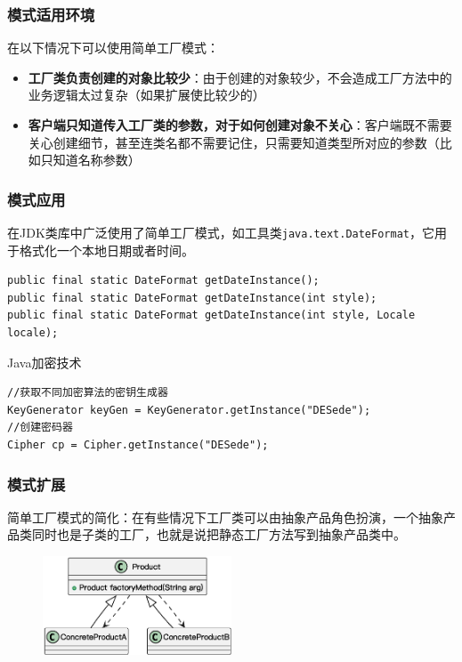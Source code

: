 \subsubsection{模式适用环境}
在以下情况下可以使用简单工厂模式：
\begin{itemize}
    \item \textbf{工厂类负责创建的对象比较少}：由于创建的对象较少，不会造成工厂方法中的业务逻辑太过复杂（如果扩展使比较少的）
    \item \textbf{客户端只知道传入工厂类的参数，对于如何创建对象不关心}：客户端既不需要关心创建细节，甚至连类名都不需要记住，只需要知道类型所对应的参数（比如只知道名称参数）
\end{itemize}

\subsubsection{模式应用}
在JDK类库中广泛使用了简单工厂模式，如工具类\;\verb|java.text.DateFormat|，它用于格式化一个本地日期或者时间。
\begin{lstlisting}
public final static DateFormat getDateInstance();
public final static DateFormat getDateInstance(int style);
public final static DateFormat getDateInstance(int style, Locale locale);
\end{lstlisting}

Java加密技术
\begin{lstlisting}
//获取不同加密算法的密钥生成器
KeyGenerator keyGen = KeyGenerator.getInstance("DESede");
//创建密码器
Cipher cp = Cipher.getInstance("DESede");
\end{lstlisting}

\subsubsection{模式扩展}
简单工厂模式的简化：在有些情况下工厂类可以由抽象产品角色扮演，一个抽象产品类同时也是子类的工厂，也就是说把静态工厂方法写到抽象产品类中。
\begin{figure}[H]
    \vspace{-0.5em}
	\centering
	\includegraphics[width=0.5\textwidth]{images/简单工厂模式的简化.eps}
    \vspace{-1em}
\end{figure}

